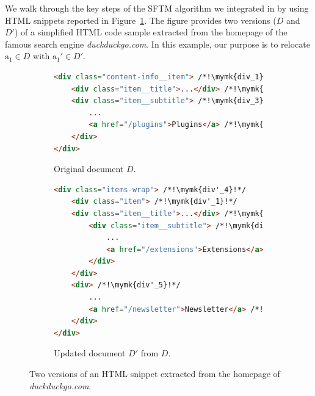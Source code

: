 We walk through the key steps of the SFTM algorithm we integrated in \erratum{} by using HTML snippets reported in Figure~\ref{fig:example_html}.
The figure provides two versions ($D$ and $D'$) of a simplified HTML code sample extracted from the homepage of the famous search engine \textit{duckduckgo.com}.
In this example, our purpose is to relocate $\text{a}_1 \in D$ with $\text{a}_1' \in D'$.

\begin{figure}
    \centering
    \begin{subfigure}[b]{\linewidth}
        \centering
        \caption{Original document $D$.}
        \begin{lstlisting}[language=html, label={fig:first_version}]
<div class="content-info__item"> /*!\mymk{div_1}!*/
    <div class="item__title">...</div> /*!\mymk{div_2}!*/
    <div class="item__subtitle"> /*!\mymk{div_3}!*/
        ... 
        <a href="/plugins">Plugins</a> /*!\mymk{~a_1~}!*/
    </div>
</div>
        \end{lstlisting}
    \end{subfigure}
    \hfill
    \begin{subfigure}[b]{\linewidth}
        \centering
        \caption{Updated document $D'$ from $D$.}
        \begin{lstlisting}[language=html, label={fig:second_version}]
<div class="items-wrap"> /*!\mymk{div'_4}!*/
    <div class="item"> /*!\mymk{div'_1}!*/
    <div class="item__title">...</div> /*!\mymk{div'_2}!*/
        <div class="item__subtitle"> /*!\mymk{div'_3}!*/
            ... 
            <a href="/extensions">Extensions</a> /*!\mymk{~a'_1~}!*/
        </div>
    </div>
    <div> /*!\mymk{div'_5}!*/  
        ...
        <a href="/newsletter">Newsletter</a> /*!\mymk{~a'_2~}!*/
    </div>
</div>
        \end{lstlisting}
    \end{subfigure}
    \caption{Two versions of an HTML snippet extracted from the homepage of \emph{duckduckgo.com}.}
    \label{fig:example_html}
\end{figure}

